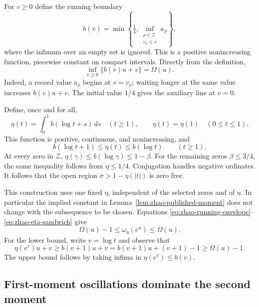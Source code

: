 \documentclass[11pt,a4paper]{article}
\numberwithin{equation}{section}
\theoremstyle{definition}\newtheorem{definition}[theorem]{Definition}
\theoremstyle{remark}\newtheorem{remark}[theorem]{Remark}
\begin{document}
For $v\geq0$ define the running boundary
\[
 b(v)=\min\left\{\tfrac14,
       \inf_{\substack{\rho\in\mathcal Z\\v_\rho\leq v}}a_\rho
             \right\},
\]
where the infimum over an empty set is ignored. This is a positive
nonincreasing function, piecewise constant on compact intervals.
Directly from the definition,
\begin{equation}
 \label{eq:zhao-running-envelope}
 \inf_{v\geq0}\{b(v)u+v\}=\Omega(u).
\end{equation}
Indeed, a record value $a_\rho$ begins at $v=v_\rho$; waiting
longer at the same value increases $b(v)u+v$. The initial value
$1/4$ gives the auxiliary line at $v=0$.

Define, once and for all,
\begin{equation}
 \label{eq:zhao-smoothed-eta}
 \eta(t)=\int_0^1 b(\log t+s)\,ds\quad(t\geq1),
 \qquad \eta(t)=\eta(1)\quad(0\leq t\leq1).
\end{equation}
This function is positive, continuous, and nonincreasing, and
\begin{equation}
 \label{eq:zhao-eta-sandwich}
 b(\log t+1)\leq\eta(t)\leq b(\log t)
 \qquad(t\geq1).
\end{equation}
At every zero in $\mathcal Z$,
$\eta(\gamma)\leq b(\log\gamma)\leq1-\beta$.
For the remaining zeros $\beta\leq3/4$, the same inequality
follows from $\eta\leq1/4$. Conjugation handles negative ordinates.
It follows that the open region
$\sigma>1-\eta(|t|)$ is zero free.

This construction uses one fixed $\eta$, independent of the selected
zeros and of $u$. In particular the implied constant in
Lemma~\ref{lem:zhao-published-moment} does not change with the
subsequence to be chosen. Equations
\eqref{eq:zhao-running-envelope}--\eqref{eq:zhao-eta-sandwich} give
\begin{equation}
 \label{eq:zhao-omega-comparison}
 \Omega(u)-1\leq\omega_\eta(e^u)\leq\Omega(u).
\end{equation}
For the lower bound, write $v=\log t$ and observe that
\[
 \eta(e^v)u+v\geq b(v+1)u+v
  =b(v+1)u+(v+1)-1\geq\Omega(u)-1.
\]
The upper bound follows by taking infima in
$\eta(e^v)\leq b(v)$.

\subsection{First-moment oscillations dominate the second moment}
\end{document}
